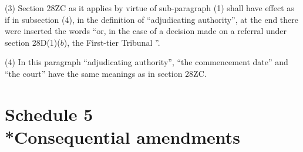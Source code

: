 \documentclass[12pt,a4paper]{article}
\begin{document}
(3) Section 28ZC as it applies by virtue of sub-paragraph (1) shall have effect as if in subsection (4), in the definition of “adjudicating authority”, at the end there were inserted the words “or, in the case of a decision made on a referral under section 28D(1)($b$), 
the First-tier Tribunal%
”.

(4) In this paragraph “adjudicating authority”, “the commencement date” and “the court” have the same meanings as in section 28ZC.


\part[Schedule 5 --- Consequential amendments]{Schedule 5\\*Consequential amendments}

\renewcommand\parthead{--- Schedule 5}


%
%
%
%
\end{document}
